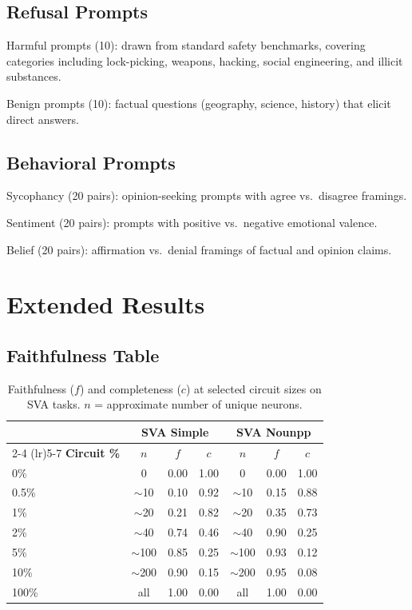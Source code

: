 \documentclass[11pt]{article}
\begin{document}
\subsection{Refusal Prompts}

Harmful prompts (10): drawn from standard safety benchmarks, covering categories including lock-picking, weapons, hacking, social engineering, and illicit substances.

Benign prompts (10): factual questions (geography, science, history) that elicit direct answers.

\subsection{Behavioral Prompts}

Sycophancy (20 pairs): opinion-seeking prompts with agree vs.\ disagree framings.

Sentiment (20 pairs): prompts with positive vs.\ negative emotional valence.

Belief (20 pairs): affirmation vs.\ denial framings of factual and opinion claims.


\section{Extended Results}
\label{sec:extended_results}

\subsection{Faithfulness Table}

\begin{table}[h]
\centering
\caption{Faithfulness ($f$) and completeness ($c$) at selected circuit sizes on SVA tasks. $n$ = approximate number of unique neurons.}
\label{tab:faithfulness_full}
\small
\begin{tabular}{lcccccc}
\toprule
& \multicolumn{3}{c}{\textbf{SVA Simple}} & \multicolumn{3}{c}{\textbf{SVA Nounpp}} \\
\cmidrule(lr){2-4} \cmidrule(lr){5-7}
\textbf{Circuit \%} & $n$ & $f$ & $c$ & $n$ & $f$ & $c$ \\
\midrule
0\%    & 0         & 0.00 & 1.00 & 0         & 0.00 & 1.00 \\
0.5\%  & $\sim$10  & 0.10 & 0.92 & $\sim$10  & 0.15 & 0.88 \\
1\%    & $\sim$20  & 0.21 & 0.82 & $\sim$20  & 0.35 & 0.73 \\
2\%    & $\sim$40  & 0.74 & 0.46 & $\sim$40  & 0.90 & 0.25 \\
5\%    & $\sim$100 & 0.85 & 0.25 & $\sim$100 & 0.93 & 0.12 \\
10\%   & $\sim$200 & 0.90 & 0.15 & $\sim$200 & 0.95 & 0.08 \\
100\%  & all       & 1.00 & 0.00 & all       & 1.00 & 0.00 \\
\bottomrule
\end{tabular}
\end{table}
\end{document}
